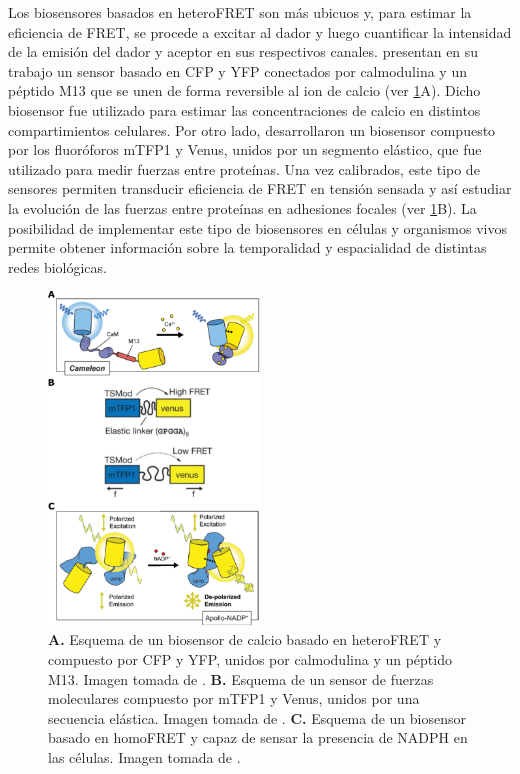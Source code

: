 Los biosensores basados en heteroFRET son más ubicuos y, para estimar la eficiencia de FRET, se procede a excitar al dador y luego cuantificar la intensidad de la emisión del dador y aceptor en sus respectivos canales. \cite{Miyawaki1997} presentan en su trabajo un sensor basado en CFP y YFP conectados por calmodulina y un péptido M13 que se unen de forma reversible al ion de calcio (ver \cref{fig:bios}A). Dicho biosensor fue utilizado para estimar las concentraciones de calcio en distintos compartimientos celulares. Por otro lado, \cite{Grashoff2010} desarrollaron un biosensor compuesto por los fluoróforos mTFP1 y Venus, unidos por un segmento elástico, que fue utilizado para medir fuerzas entre proteínas. Una vez calibrados, este tipo de sensores permiten transducir eficiencia de FRET en tensión sensada y así estudiar la evolución de las fuerzas entre proteínas en adhesiones focales (ver \cref{fig:bios}B). La posibilidad de implementar este tipo de biosensores en células y organismos vivos permite obtener información sobre la temporalidad y espacialidad de distintas redes biológicas.

\begin{figure}[htb]
    \centering
    \includegraphics[width=0.5\textwidth]{img/cap_1/biosensors.pdf}
    \caption{\footnotesize{\textbf{A.} Esquema de un biosensor de calcio basado en heteroFRET y compuesto por CFP y YFP, unidos por calmodulina y un péptido M13. Imagen tomada de \cite{Greenwald2018}. \textbf{B.} Esquema de un sensor de fuerzas moleculares compuesto por mTFP1 y Venus, unidos por una secuencia elástica. Imagen tomada de \cite{Grashoff2010}. \textbf{C.} Esquema de un biosensor basado en homoFRET y capaz de sensar la presencia de NADPH en las células. Imagen tomada de \cite{Greenwald2018}.}}
    \label{fig:bios}
\end{figure}

